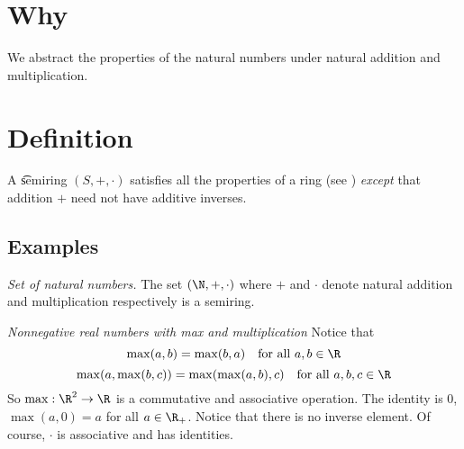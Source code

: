 
\section*{Why}

We abstract the properties of the natural numbers under natural addition and multiplication.

\section*{Definition}

A \t{semiring} $(S, +, \cdot )$ satisfies all the properties of a ring (see ) \textit{except} that addition $+$ need not have additive inverses.

\subsection*{Examples}



\textit{Set of natural numbers.}
The set $(\N  , +, \cdot )$ where $+$ and $\cdot $ denote natural addition and multiplication respectively is a semiring.


\textit{Nonnegative real numbers with max and multiplication}
Notice that
\[
\max(a, b) = \max(b, a) \quad \text{for all } a, b \in \R
\]
\[
\max(a, \max(b, c)) = \max(\max(a, b), c) \quad \text{for all } a, b, c \in \R
\]
So $\max: \R ^2 \to \R $ is a commutative and associative operation.
The identity is $0$, $\max(a, 0) = a$ for all $a \in \R _+$.
Notice that there is no inverse element.
Of course, $\cdot $ is associative and has identities.

\blankpage